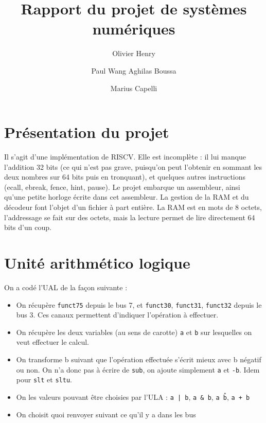 \documentclass{article}
\author{
  Olivier Henry
  \and
  Paul Wang  
  Aghilas Boussa
  \and
  Marius Capelli
}
\date{}
\title{ Rapport du projet de systèmes numériques}
\begin{document}
\maketitle

\newpage

\section{Présentation du projet}

Il s'agit d'une implémentation de RISCV. Elle est incomplète : il lui manque l'addition 32 bits (ce qui n'est pas grave, puisqu'on peut l'obtenir en sommant les deux nombres sur 64 bits puis en tronquant), et quelques autres instructions (ecall, ebreak, fence, hint, pause). Le projet embarque un assembleur, ainsi qu'une petite horloge écrite dans cet assembleur. La gestion de la RAM et du décodeur font l'objet d'un fichier à part entière. La RAM est en mots de 8 octets, l'addressage se fait sur des octets, mais la lecture permet de lire directement 64 bits d'un coup. 

\section{Unité arithmético logique}

On a codé l'UAL de la façon suivante : 
\begin{itemize}
    \item On récupère \texttt{funct75} depuis le bus 7, et \texttt{funct30}, \texttt{funct31}, \texttt{funct32} depuis le bus 3. Ces canaux permettent d'indiquer l'opération à effectuer. 
    \item On récupère les deux variables (au sens de carotte) \texttt{a} et \texttt{b} sur lesquelles on veut effectuer le calcul. 
    \item On transforme b suivant que l'opération effectuée s'écrit mieux avec b négatif ou non. On n'a donc pas à écrire de \texttt{sub}, on ajoute simplement \texttt{a} et \texttt{-b}. Idem pour \texttt{slt} et \texttt{sltu}.
    \item On les valeurs pouvant être choisies par l'ULA : \texttt{a | b}, \texttt{a \& b}, \texttt{a \^ b}, \texttt{a + b}
    \item On choisit quoi renvoyer suivant ce qu'il y a dans les bus 
\end{itemize}
\end{document}
